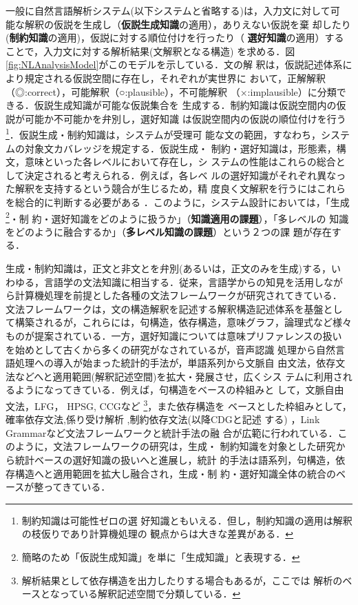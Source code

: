 一般に自然言語解析システム(以下システムと省略する)は，入力文に対して可
能な解釈の仮説を生成し（{\bf 仮説生成知識}の適用），ありえない仮説を棄
却したり({\bf 制約知識}の適用)，仮説に対する順位付けを行ったり（{\bf 
選好知識}の適用）することで，入力文に対する解析結果(文解釈となる構造) 
を求める．図\ref{fig:NLAnalysisModel}がこのモデルを示している．文の解
釈は，仮説記述体系により規定される仮説空間に存在し，それぞれが実世界に
おいて，正解解釈（◎:correct），可能解釈（○:plausible），不可能解釈
（×:implausible）に分類できる．仮説生成知識が可能な仮説集合を
生成する．制約知識は仮説空間内の仮説が可能か不可能かを弁別し，選好知識
は仮説空間内の仮説の順位付けを行う\footnote{制約知識は可能性ゼロの選
好知識ともいえる．但し，制約知識の適用は解釈の枝仮りであり計算機処理の
観点からは大きな差異がある．}．仮説生成・制約知識は，システムが受理可
能な文の範囲，すなわち，システムの対象文カバレッジを規定する．仮説生成・
制約・選好知識は，形態素，構文，意味といった各レベルにおいて存在し，シ
ステムの性能はこれらの総合として決定されると考えられる．例えば，各レベ
ルの選好知識がそれぞれ異なった解釈を支持するという競合が生じるため，精
度良く文解釈を行うにはこれらを総合的に判断する必要がある
\cite{Hirakawa89a}．このように，システム設計においては，「生成
\footnote{簡略のため「仮説生成知識」を単に「生成知識」と表現する．}・制
約・選好知識をどのように扱うか」（{\bf 知識適用の課題}），「多レベルの
知識をどのように融合するか」（{\bf 多レベル知識の課題}）という２つの課
題が存在する．

生成・制約知識は，正文と非文とを弁別(あるいは，正文のみを生成)する，い
わゆる，言語学の文法知識に相当する．従来，言語学からの知見を活用しなが
ら計算機処理を前提とした各種の文法フレームワークが研究されてきている．
文法フレームワークは，文の構造解釈を記述する解釈構造記述体系を基盤とし
て構築されるが，これらには，句構造，依存構造，意味グラフ，論理式など様々
ものが提案されている．一方，選好知識については意味プリファレンスの扱い
\cite{Wilks75}を始めとして古くから多くの研究がなされているが，音声認識
処理から自然言語処理への導入が始まった統計的手法が，単語系列から文脈自
由文法，依存文法などへと適用範囲(解釈記述空間)を拡大・発展させ，広くシス
テムに利用されるようになってきている．例えば，句構造をベースの枠組みと
して，文脈自由文法，LFG\cite{Kaplan89,Riezler02}，
HPSG\cite{Pollard94,Tsuruoka04}, CCG\cite{Steedman00,Clark03}など
\footnote{解析結果として依存構造を出力したりする場合もあるが，ここでは
解析のベースとなっている解釈記述空間で分類している．}，また依存構造を
ベースとした枠組みとして，確率依存文法\cite{Lee97},係り受け解析
\cite{Shudo80,Ozeki94,Hirakawa01,Kudo05_j},制約依存文法(以降CDGと記述
する) \cite{Maruyama90,Wang04}，Link
Grammar\cite{Sleator91,Lafferty92}など文法フレームワークと統計手法の融
合が広範に行われている．このように，文法フレームワークの研究は，生成・
制約知識を対象とした研究から統計ベースの選好知識の扱いへと進展し，統計
的手法は語系列，句構造，依存構造へと適用範囲を拡大し融合され，生成・制
約・選好知識全体の統合のベースが整ってきている．


